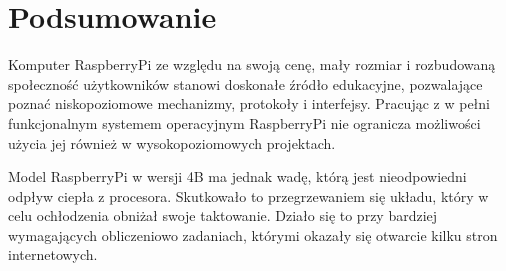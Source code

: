 \documentclass[12pt]{article}
\begin{document}
\newpage
\section{Podsumowanie}
Komputer RaspberryPi ze względu na swoją cenę, mały rozmiar i rozbudowaną społeczność użytkowników stanowi doskonałe źródło edukacyjne, pozwalające poznać niskopoziomowe mechanizmy, protokoły i interfejsy. Pracując z w pełni funkcjonalnym systemem operacyjnym RaspberryPi nie ogranicza możliwości użycia jej również w wysokopoziomowych projektach. 

Model RaspberryPi w wersji 4B ma jednak wadę, którą jest nieodpowiedni odpływ ciepła z procesora. Skutkowało to przegrzewaniem się układu, który w celu ochłodzenia obniżał swoje taktowanie. Działo się to przy bardziej wymagających obliczeniowo zadaniach, którymi okazały się otwarcie kilku stron internetowych.


\end{document}
